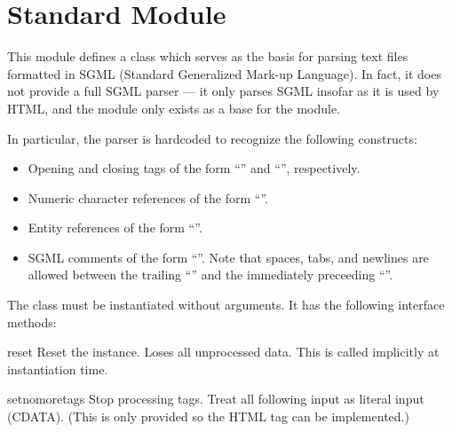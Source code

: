 \section{Standard Module }
\label{module-sgmllib}

This module defines a class  which serves as the
basis for parsing text files formatted in SGML (Standard Generalized
Mark-up Language).  In fact, it does not provide a full SGML parser
--- it only parses SGML insofar as it is used by HTML, and the module
only exists as a base for the  module.

In particular, the parser is hardcoded to recognize the following
constructs:

\begin{itemize}

\item
Opening and closing tags of the form
``'' and
``'', respectively.

\item
Numeric character references of the form ``''.

\item
Entity references of the form ``''.

\item
SGML comments of the form ``''.  Note that
spaces, tabs, and newlines are allowed between the trailing
``\code{>}'' and the immediately preceeding ``\code{--}''.

\end{itemize}

The  class must be instantiated without arguments.
It has the following interface methods:

\renewcommand{\indexsubitem}{(SGMLParser method)}

\begin{funcdesc}{reset}{}
Reset the instance.  Loses all unprocessed data.  This is called
implicitly at instantiation time.
\end{funcdesc}

\begin{funcdesc}{setnomoretags}{}
Stop processing tags.  Treat all following input as literal input
(CDATA).  (This is only provided so the HTML tag 
can be implemented.)
\end{funcdesc}

